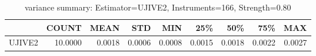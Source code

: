 \begin{table}[ht]
\centering
\caption{variance summary: Estimator=UJIVE2, Instruments=166, Strength=0.80}
\begin{tabular}{lrrrrrrrr}
\toprule
 & COUNT & MEAN & STD & MIN & 25\% & 50\% & 75\% & MAX \\
\midrule
UJIVE2 & 10.0000 & 0.0018 & 0.0006 & 0.0008 & 0.0015 & 0.0018 & 0.0022 & 0.0027 \\
\bottomrule
\end{tabular}
\end{table}

